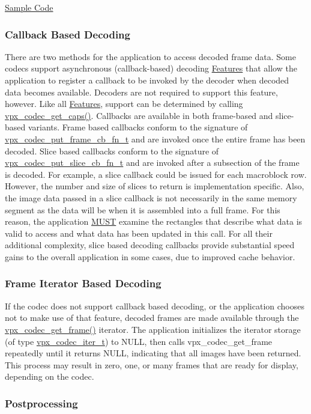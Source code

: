 \hyperlink{samples}{Sample Code}\hypertarget{usage_decode_usage_cb}{}\subsubsection{Callback Based Decoding}\label{usage_decode_usage_cb}
There are two methods for the application to access decoded frame data. Some codecs support asynchronous (callback-\/based) decoding \hyperlink{usage_usage_features}{Features} that allow the application to register a callback to be invoked by the decoder when decoded data becomes available. Decoders are not required to support this feature, however. Like all \hyperlink{usage_usage_features}{Features}, support can be determined by calling \hyperlink{group__codec_ga43adff58759093401235fb99247c82b8}{vpx\+\_\+codec\+\_\+get\+\_\+caps()}. Callbacks are available in both frame-\/based and slice-\/based variants. Frame based callbacks conform to the signature of \hyperlink{group__cap__put__frame_ga1c3d3d07ec4f907dc426bbd6d70862ec}{vpx\+\_\+codec\+\_\+put\+\_\+frame\+\_\+cb\+\_\+fn\+\_\+t} and are invoked once the entire frame has been decoded. Slice based callbacks conform to the signature of \hyperlink{group__cap__put__slice_ga344dbbf130aa9632aee94cee1f3cef44}{vpx\+\_\+codec\+\_\+put\+\_\+slice\+\_\+cb\+\_\+fn\+\_\+t} and are invoked after a subsection of the frame is decoded. For example, a slice callback could be issued for each macroblock row. However, the number and size of slices to return is implementation specific. Also, the image data passed in a slice callback is not necessarily in the same memory segment as the data will be when it is assembled into a full frame. For this reason, the application \hyperlink{rfc2119_MUST}{M\+U\+S\+T} examine the rectangles that describe what data is valid to access and what data has been updated in this call. For all their additional complexity, slice based decoding callbacks provide substantial speed gains to the overall application in some cases, due to improved cache behavior.\hypertarget{usage_decode_usage_frame_iter}{}\subsubsection{Frame Iterator Based Decoding}\label{usage_decode_usage_frame_iter}
If the codec does not support callback based decoding, or the application chooses not to make use of that feature, decoded frames are made available through the \hyperlink{group__decoder_ga0e231c3a5ce445fdb2268d741da97500}{vpx\+\_\+codec\+\_\+get\+\_\+frame()} iterator. The application initializes the iterator storage (of type \hyperlink{group__codec_ga6ea348f76b1f8a1fe50e14db684146c6}{vpx\+\_\+codec\+\_\+iter\+\_\+t}) to N\+U\+L\+L, then calls vpx\+\_\+codec\+\_\+get\+\_\+frame repeatedly until it returns N\+U\+L\+L, indicating that all images have been returned. This process may result in zero, one, or many frames that are ready for display, depending on the codec.\hypertarget{usage_decode_usage_postproc}{}\subsubsection{Postprocessing}\label{usage_decode_usage_postproc}

